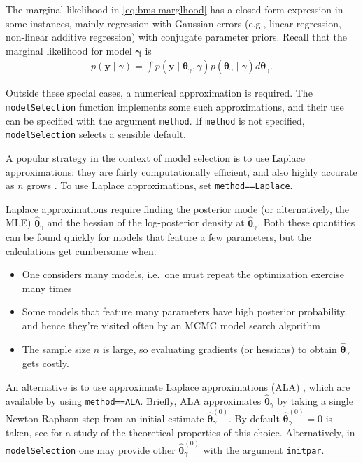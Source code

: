 \documentclass[
]{book}
\newcommand{\bgamma}{\mathbf{\gamma}}
\newcommand{\btheta}{\mathbf{\theta}}
\newcommand{\by}{\mathbf{y}}
\theoremstyle{definition}
\theoremstyle{definition}
\theoremstyle{definition}
\theoremstyle{definition}
\theoremstyle{remark}
\begin{document}
The marginal likelihood in \eqref{eq:bms-marglhood} has a closed-form expression in some instances, mainly regression with Gaussian errors (e.g., linear regression, non-linear additive regression) with conjugate parameter priors.
Recall that the marginal likelihood for model \(\bgamma\) is
\begin{align*}
p(\by \mid \gamma)= \int p(\by \mid \btheta_\gamma, \gamma) p(\btheta_\gamma \mid \gamma) d\btheta_\gamma.
\end{align*}

Outside these special cases, a numerical approximation is required.
The \texttt{modelSelection} function implements some such approximations, and their use can be specified with the argument \texttt{method}.
If \texttt{method} is not specified, \texttt{modelSelection} selects a sensible default.

A popular strategy in the context of model selection is to use Laplace approximations: they are fairly computationally efficient, and also highly accurate as \(n\) grows \citep{kass:1990}.
To use Laplace approximations, set \texttt{method==\textquotesingle{}Laplace\textquotesingle{}}.

Laplace approximations require finding the posterior mode (or alternatively, the MLE) \(\hat{\btheta}_\gamma\) and the hessian of the log-posterior density at \(\hat{\btheta}_\gamma\). Both these quantities can be found quickly for models that feature a few parameters, but the calculations get cumbersome when:

\begin{itemize}
\item
  One considers many models, i.e.~one must repeat the optimization exercise many times
\item
  Some models that feature many parameters have high posterior probability, and hence they're visited often by an MCMC model search algorithm
\item
  The sample size \(n\) is large, so evaluating gradients (or hessians) to obtain \(\hat{\btheta}_\gamma\) gets costly.
\end{itemize}

An alternative is to use approximate Laplace approximations (ALA) \citep{rossell:2021}, which are available by using \texttt{method==\textquotesingle{}ALA\textquotesingle{}}.
Briefly, ALA approximates \(\hat{\btheta}_\gamma\) by taking a single Newton-Raphson step from an initial estimate \(\hat{\btheta}_\gamma^{(0)}\). By default \(\hat{\btheta}_\gamma^{(0)}= 0\) is taken, see \citet{rossell:2021} for a study of the theoretical properties of this choice. Alternatively, in \texttt{modelSelection} one may provide other
\(\hat{\btheta}_\gamma^{(0)}\) with the argument \texttt{initpar}.
\end{document}
